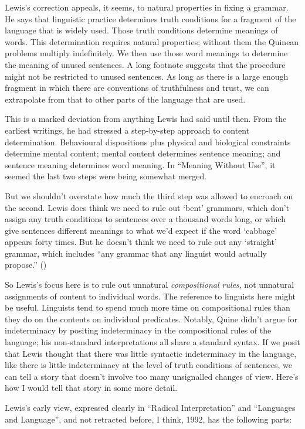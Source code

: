 \documentclass[
  11pt,
  letterpaper,
  DIV=11,
  numbers=noendperiod,
  twoside]{scrartcl}
\begin{document}
Lewis's correction appeals, it seems, to natural properties in fixing a
grammar. He says that linguistic practice determines truth conditions
for a fragment of the language that is widely used. Those truth
conditions determine meanings of words. This determination requires
natural properties; without them the Quinean problems multiply
indefinitely. We then use those word meanings to determine the meaning
of unused sentences. A long footnote suggests that the procedure might
not be restricted to unused sentences. As long as there is a large
enough fragment in which there are conventions of truthfulness and
trust, we can extrapolate from that to other parts of the language that
are used.

This is a marked deviation from anything Lewis had said until then. From
the earliest writings, he had stressed a step-by-step approach to
content determination. Behavioural dispositions plus physical and
biological constraints determine mental content; mental content
determines sentence meaning; and sentence meaning determines word
meaning. In ``Meaning Without Use'', it seemed the last two steps were
being somewhat merged.

But we shouldn't overstate how much the third step was allowed to
encroach on the second. Lewis does think we need to rule out `bent'
grammars, which don't assign any truth conditions to sentences over a
thousand words long, or which give sentences different meanings to what
we'd expect if the word `cabbage' appears forty times. But he doesn't
think we need to rule out any `straight' grammar, which includes ``any
grammar that any linguist would actually propose.''
()

So Lewis's focus here is to rule out unnatural \emph{compositional
rules}, not unnatural assignments of content to individual words. The
reference to linguists here might be useful. Linguists tend to spend
much more time on compositional rules than they do on the contents on
individual predicates. Notably, Quine didn't argue for indeterminacy by
positing indeterminacy in the compositional rules of the language; his
non-standard interpretations all share a standard syntax. If we posit
that Lewis thought that there was little syntactic indeterminacy in the
language, like there is little indeterminacy at the level of truth
conditions of sentences, we can tell a story that doesn't involve too
many unsignalled changes of view. Here's how I would tell that story in
some more detail.

Lewis's early view, expressed clearly in ``Radical Interpretation'' and
``Languages and Language'', and not retracted before, I think, 1992, has
the following parts:
\end{document}
